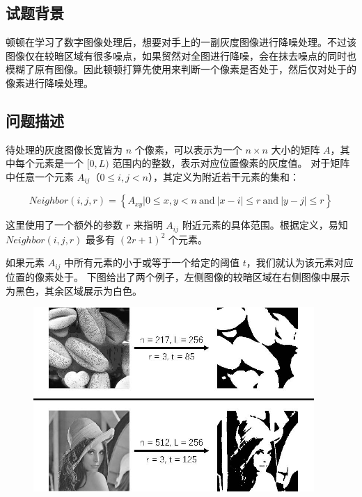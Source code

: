 \subsection*{试题背景}

顿顿在学习了数字图像处理后，想要对手上的一副灰度图像进行降噪处理。不过该图像仅在较暗区域有很多噪点，如果贸然对全图进行降噪，会在抹去噪点的同时也模糊了原有图像。因此顿顿打算先使用{}来判断一个像素是否处于{}，然后仅对处于{}的像素进行降噪处理。


\subsection*{问题描述}

待处理的灰度图像长宽皆为 $n$ 个像素，可以表示为一个 $n \times n$ 大小的矩阵 $A$，其中每个元素是一个 $[0, L)$ 范围内的整数，表示对应位置像素的灰度值。
对于矩阵中任意一个元素 $A_{ij}$（$0 \le i, j < n$），其{}定义为附近若干元素的集和：

\begin{equation*}
    Neighbor(i, j, r) = \left\{ A_{xy} | 0 \le x, y < n \mathrm{~and~} |x-i| \le r \mathrm{~and~} |y-j| \le r \right\}
\end{equation*}


这里使用了一个额外的参数 $r$ 来指明 $A_{ij}$ 附近元素的具体范围。根据定义，易知 $Neighbor(i, j, r)$ 最多有 $(2r+1)^2$ 个元素。

如果元素 $A_{ij}$ {}中所有元素的{}小于或等于一个给定的阈值 $t$，我们就认为该元素对应位置的像素处于{}。
下图给出了两个例子，左侧图像的较暗区域在右侧图像中展示为黑色，其余区域展示为白色。

\begin{figure}[H]
    \centering
    \includegraphics[width=0.95\textwidth]{image/22/2-p-1.jpg}
\end{figure}

